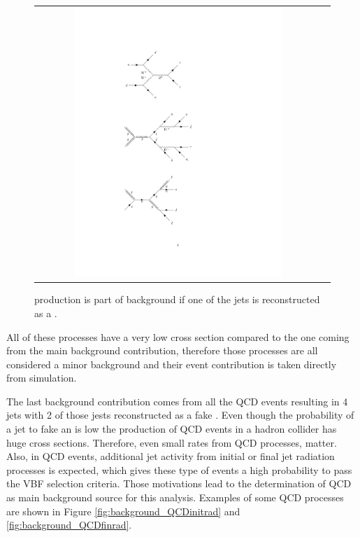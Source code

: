 \begin{figure}[tbh!]
	\centering
	\begin{tabular}{cc}
		\includegraphics[width=0.75\textwidth]{diagrams/pics/background_ttbar.pdf}
	\end{tabular}
	\caption{\ttbar production is part of background if one of the jets is reconstructed as a \hadtau.}
	\label{fig:background_ttbar}
\end{figure}

All of these processes have a very low cross section compared to the one coming from the main background contribution, therefore those processes are all considered a minor background and their event contribution is taken directly from simulation.

The last background contribution comes from all the QCD events resulting in 4 jets with 2 of those jests reconstructed as a fake \hadtau. Even though the probability of a jet to fake an \hadtau is low the production of QCD events in a hadron collider has huge cross sections. Therefore, even small \hadtaufake rates from QCD processes, matter. Also, in QCD events, additional jet activity from initial or final jet radiation processes is expected, which gives these type of events a high probability to pass the VBF selection criteria. Those motivations lead to the determination of QCD as main background source for this analysis. Examples of some QCD processes are shown in Figure \ref{fig:background_QCDinitrad} and \ref{fig:background_QCDfinrad}.

